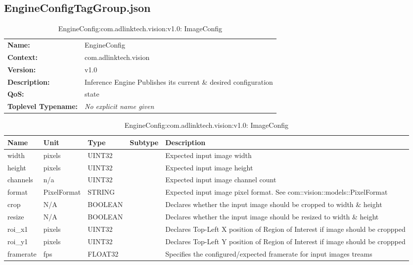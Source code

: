 \subsection{EngineConfigTagGroup.json}

\begin{table}[H]
\begin{tabularx}{\textwidth}{l X} 
       \textbf{Name:} & EngineConfig \\ 
	   \textbf{Context:} & com.adlinktech.vision \\ 
	   \textbf{Version:} & v1.0 \\ 
	   \textbf{Description:} & Inference Engine Publishes its current \& desired configuration \\ 
	   \textbf{QoS:} & state \\
	   \textbf{Toplevel Typename:} & \textit{No explicit name given} \\ 
\end{tabularx}
\caption{EngineConfig:com.adlinktech.vision:v1.0}\label{EngineConfigTagGroup.json:table:EngineConfig}
\bigskip
\begin{tabularx}{\textwidth}{l l l l X} 
	 \textbf{Name} & \textbf{Unit} & \textbf{Type} & \textbf{Subtype} & \textbf{Description} \\
	 \midrule
   width & pixels & UINT32 &  & Expected input image width \\
   height & pixels & UINT32 &  & Expected input image height \\
   channels & n/a & UINT32 &  & Expected input image channel count \\
   format & PixelFormat & STRING &  & Expected input image pixel format. See com::vision::models::PixelFormat \\
   crop & N/A & BOOLEAN &  & Declares whether the input image should be cropped to width \& height \\
   resize & N/A & BOOLEAN &  & Declares whether the input image should be resized to width \& height \\
   roi\_x1 & pixels & UINT32 &  & Declares Top-Left X position of Region of Interest if image should be croppped \\
   roi\_y1 & pixels & UINT32 &  & Declares Top-Left Y position of Region of Interest if image should be croppped \\
   framerate & fps & FLOAT32 &  & Specifies the configured/expected framerate for input images treams \\
\end{tabularx}
\caption{EngineConfig:com.adlinktech.vision:v1.0: ImageConfig}\label{EngineConfigTagGroup.json:table:EngineConfig-ImageConfig}


\end{table}
